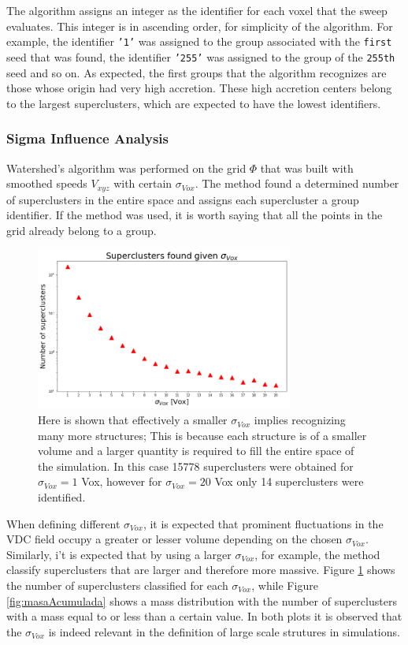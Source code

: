 \documentclass[a4paper,fleqn,usenatbib]{mnras}
\begin{document}
The algorithm assigns an integer as the identifier for each voxel that the sweep evaluates. This integer is in ascending order, for simplicity of the algorithm. For example, the identifier \texttt{'1'} was assigned to the group associated with the \texttt{first} seed that was found, the identifier \texttt{'255'} was assigned to the group of the \texttt{255th} seed and so on. As expected, the first groups that the algorithm recognizes are those whose origin had very high accretion. These high accretion centers belong to the largest superclusters, which are expected to have the lowest identifiers.

\subsubsection{Sigma Influence Analysis}
\label{sec:Sigmainfluence}
Watershed's algorithm was performed on the grid $\Phi$ that was built with smoothed speeds $V_{xyz}$ with certain  $\sigma_{Vox}$. The method found a determined number of superclusters in the entire space and assigns each supercluster a group identifier. If the method was used, it is worth saying that all the points in the grid already belong to a group.

\begin{figure}
    \centering
    \includegraphics[width=240pt]{Nclusters.png}
    \caption{Here is shown that effectively a smaller $\sigma_{Vox}$ implies recognizing many more structures; This is because each structure is of a smaller volume and a larger quantity is required to fill the entire space of the simulation. In this case 15778 superclusters were obtained for $\sigma_{Vox}=1$ Vox, however for $\sigma_{Vox}=20$ Vox only 14 superclusters were identified.}
    \label{fig:Nclusters}
\end{figure}

When defining different $\sigma_{Vox}$, it is expected that prominent fluctuations in the VDC field occupy a greater or lesser volume depending on the chosen $\sigma_{Vox}$. Similarly, i't is expected that by using a larger $\sigma_{Vox}$, for example, the method classify superclusters that are larger and therefore more massive. Figure \ref{fig:Nclusters} shows the number of superclusters classified for each $\sigma_{Vox}$, while Figure \ref{fig:masaAcumulada}  shows a mass distribution with the number of superclusters with a mass equal to or less than a certain value. In both plots it is observed that the $\sigma_{Vox}$ is indeed relevant in the definition of large scale strutures in simulations.
\end{document}
